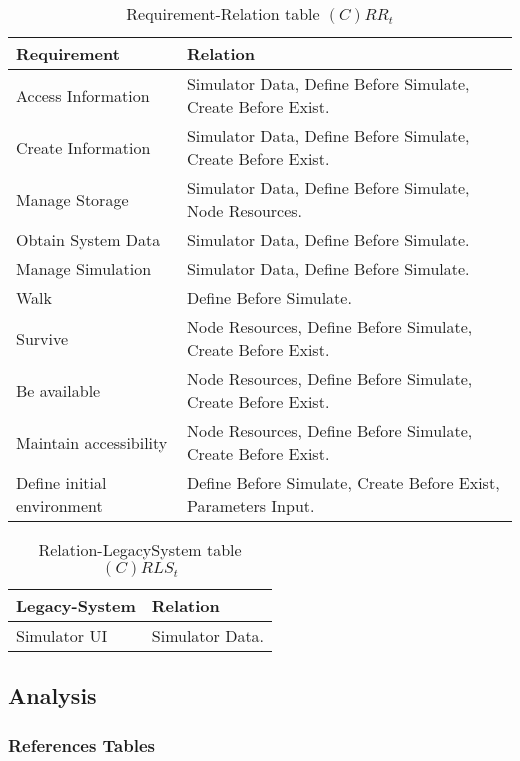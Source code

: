 \begin{table}[H]
	\centering
	\begin{tabular}{|p{4cm}|p{8cm}|}
			\hline
			\textbf{Requirement} & \textbf{Relation} \\
			\hline
			Access Information & Simulator Data, Define Before Simulate, Create
			Before Exist. \\
			\hline
			Create Information & Simulator Data, Define Before Simulate, Create
			Before Exist. \\
			\hline
			Manage Storage & Simulator Data, Define Before Simulate, Node Resources.  \\
			\hline
			Obtain System Data & Simulator Data, Define Before Simulate. \\
			\hline
			Manage Simulation & Simulator Data, Define Before Simulate. \\
			\hline
			Walk & Define Before Simulate. \\
			\hline
			Survive & Node Resources, Define Before Simulate, Create Before Exist. \\
			\hline
			Be available & Node Resources, Define Before Simulate, Create Before Exist. \\
			\hline
			Maintain accessibility & Node Resources, Define Before Simulate, Create Before Exist. \\
			\hline
			Define initial environment & Define Before Simulate, Create Before
			Exist, Parameters Input. \\
			\hline
		\end{tabular}
	\caption{Requirement-Relation table $(C)RR_t$}
	\label{tab:crrt}
\end{table}

\begin{table}[H]
	\centering
	\begin{tabular}{|p{4cm}|p{8cm}|}
			\hline
			\textbf{Legacy-System} & \textbf{Relation} \\
			\hline
			Simulator UI & Simulator Data. \\
			\hline
		\end{tabular}
	\caption{Relation-LegacySystem table $(C)RLS_t$}
	\label{tab:crlst}
\end{table}

\subsection{Analysis}

\subsubsection*{References Tables}

